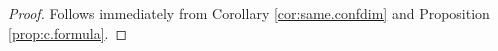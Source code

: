 \documentclass[12pt]{amsart}
\theoremstyle{plain}
\theoremstyle{definition}
\numberwithin{equation}{section}
\newcommand{\la}{\lambda}
\newcommand{\D}{\Delta}
\newcommand{\g}{\mathfrak{g}}
\newcommand{\sll}{\mathfrak{sl}}
\begin{document}
\begin{proof}
Follows immediately from Corollary \ref{cor:same.confdim} and Proposition \ref{prop:c.formula}.
\end{proof}
%
%
%
%
%
%
%
\end{document}
